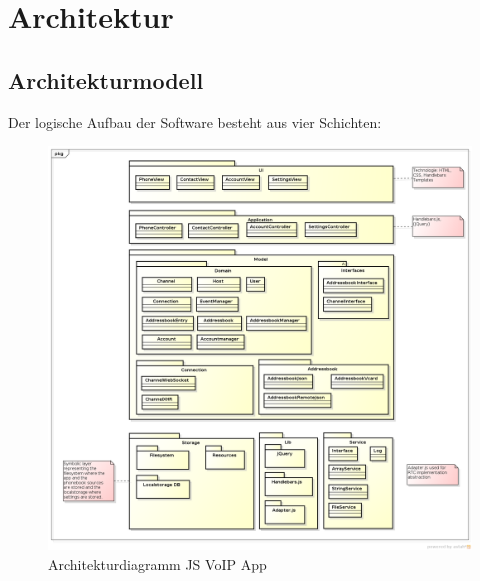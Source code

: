 \chapter{Architektur}

\section{Architekturmodell}
	Der logische Aufbau der Software besteht aus vier Schichten:
	\begin{figure}[h]
		\centering
		\includegraphics[width=1\textwidth]{../architekturanalayse/img/architecture.png}
		\caption{Architekturdiagramm JS VoIP App}
	\end{figure}

